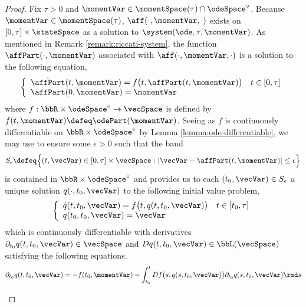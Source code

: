 \begin{proof}
  \label{proof:proposition:momentSpace-facts}
  Fix $\tau > 0$ and $\momentVar \in \momentSpace(\tau) \cap \odeSpace^\circ$.
  Because $\momentVar \in \momentSpace(\tau)$, $\aff(\cdot,\momentVar,\cdot)$ exists on $[0,\tau]\times\stateSpace$ as a solution to $\system(\ode,\tau,\momentVar)$.
  As mentioned in Remark \ref{remark:riccati-system}, the function $\affPart(\cdot,\momentVar)$ associated with $\aff(\cdot,\momentVar,\cdot)$ is a solution to the following equation,
  \begin{equation}
    \label{eq:system'}
    \left\{\begin{array}{ll}
      \dot\affPart(t,\momentVar) = f\big(t, \affPart(t,\momentVar)\big) & t \in [0,\tau] \\
      \affPart(0,\momentVar) = \momentVar
    \end{array}\right.
  \end{equation}
  where $f: \bbR \times \odeSpace^\circ \rightarrow \vecSpace$ is defined by $f(t, \momentVar) \defeq \odePart(\momentVar)$.
  Seeing as $f$ is continuously differentiable on $\bbR \times \odeSpace^\circ$ by Lemma \ref{lemma:ode-differentiable}, we may use \cite[III.13 Theorem X]{walter1998} to ensure some $\epsilon > 0$ such that the band
  \begin{equation}
    S_\epsilon \defeq \Big\{ (t, \vecVar) \in [0,\tau] \times \vecSpace : |\vecVar-\affPart(t,\momentVar)| \leq \epsilon \Big\}
  \end{equation}
  is contained in $\bbR \times \odeSpace^\circ$ and provides us to each $(t_0, \vecVar) \in S_\epsilon$ a unique solution $q(\cdot,t_0,\vecVar)$ to the following initial value problem,
  \begin{equation}
    \left\{\begin{array}{ll}
      \dot q(t,t_0,\vecVar) = f\big(t, q(t,t_0,\vecVar)\big) & t \in [t_0,\tau] \\
      q(t_0,t_0,\vecVar) = \vecVar
    \end{array}\right.
  \end{equation}
  which is continuously differentiable with derivatives $\partial_{t_0} q(t,t_0,\vecVar) \in \vecSpace$ and $Dq(t,t_0,\vecVar) \in \bbL(\vecSpace)$ satisfying the following equations.
  \begin{align}
    \partial_{t_0} q(t, t_0, \vecVar) 
    &= -f(t_0,\momentVar) + \int_{t_0}^t Df\big(s, q(s,t_0,\vecVar) \big) \partial_{t_0} q(s,t_0, \vecVar) \rmd s \\[0.5em]

\end{align}
\end{proof}
